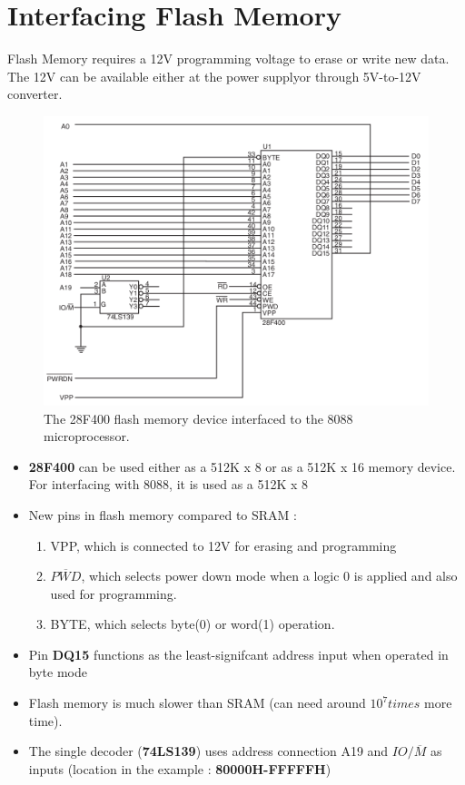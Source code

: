 \section{Interfacing Flash Memory}
Flash Memory requires a 12V programming voltage to erase or write new data. The 12V can be available either at the power supplyor through 5V-to-12V converter.
\begin{figure}[h!]
  \centering
  \includegraphics[width = 1\textwidth]{./figures/Flash_mem.png}
  \caption{The 28F400 flash memory device interfaced to the 8088 microprocessor.}
  \label{}
\end{figure}
\begin{itemize}
  \item \textbf{28F400} can be used either as a 512K x 8 or as a 512K x 16 memory device. For interfacing with 8088, it is used as a 512K x 8
  \item New pins in flash memory compared to SRAM :
  \begin{enumerate}
    \item VPP, which is connected to 12V for erasing and programming
    \item $\overline{PWD}$, which selects power down mode when a logic 0 is applied and also used for programming.
    \item BYTE, which selects byte(0) or word(1) operation.
  \end{enumerate}

  \item Pin \textbf{DQ15} functions as the least-signifcant address input when operated in byte mode
  \item Flash memory is much slower than SRAM (can need around $10^7 times$ more time).
  \item The single decoder (\textbf{74LS139}) uses address connection A19 and $IO/\overline{M}$ as inputs (location in the example : \textbf{80000H-FFFFFH})
\end{itemize}

